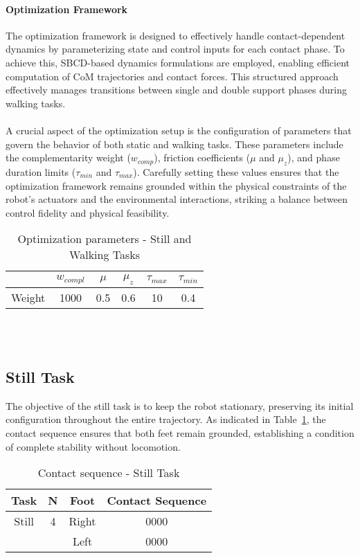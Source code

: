 \documentclass[main.tex]{subfiles}
\begin{document}
\paragraph{Optimization Framework} The optimization framework is designed to effectively handle contact-dependent dynamics by parameterizing state and control inputs for each contact phase. To achieve this, SBCD-based dynamics formulations are employed, enabling efficient computation of CoM trajectories and contact forces. This structured approach effectively manages transitions between single and double support phases during walking tasks.\\
\\
A crucial aspect of the optimization setup is the configuration of parameters that govern the behavior of both static and walking tasks. These parameters include the complementarity weight ($w_{comp}$), friction coefficients ($\mu$ and $\mu_z$), and phase duration limits ($\tau_{min}$ and $\tau_{max}$). Carefully setting these values ensures that the optimization framework remains grounded within the physical constraints of the robot’s actuators and the environmental interactions, striking a balance between control fidelity and physical feasibility.
\begin{table}[h!]
    \centering
    \begin{tabular}{lccccc}
        \toprule
        & $w_{compl}$ & $\mu$ & $\mu_z$ & $\tau_{max}$ & $\tau_{min}$ \\
        \midrule 
        Weight & 1000 & 0.5 & 0.6 & 10 & 0.4 \\
        \bottomrule
    \end{tabular}
    \caption{Optimization parameters - Still and Walking Tasks}
\end{table}
\\
\\
\subsection{Still Task}  
The objective of the still task is to keep the robot stationary, preserving its initial configuration throughout the entire trajectory. As indicated in Table~\ref{tab:stilltask}, the contact sequence ensures that both feet remain grounded, establishing a condition of complete stability without locomotion.
\begin{table}[h!]
    \centering
    \begin{tabular}{|c|c|c|c|}
    \hline
    Task & N & Foot & Contact Sequence \\
    \hline
    Still & 4 & Right & 0000 \\
    & & Left & 0000 \\
    \hline
    \end{tabular}
    \caption{Contact sequence - Still Task}
    \label{tab:stilltask}
\end{table}
\end{document}
